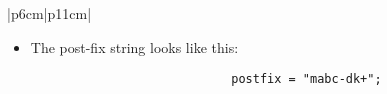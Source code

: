 \begin{center}
\begin{longtable}{ |p{6cm}|p{11cm}| }
\begin{itemize}
                \item The post-fix string looks like this:
                    {
                        \begin{verbatim}
                            postfix = "mabc-dk+";
                        \end{verbatim}
                    }
            \end{itemize}
        \\ 
        \hline
        \hline
     \\
    \hline
    \hline
    
        

\end{longtable}
\end{center}
